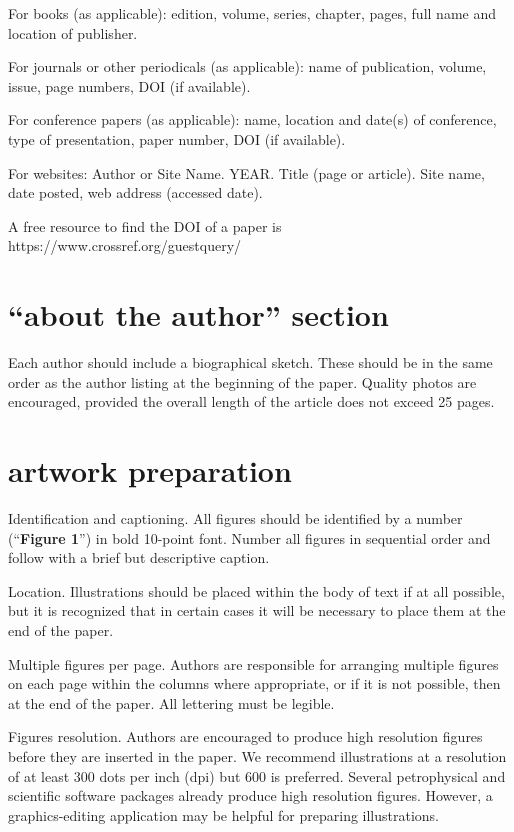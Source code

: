 \documentclass[10pt,twocolumn,twoside]{article}
\begin{document}
For books (as applicable): edition, volume, series, chapter, pages, full name and location of publisher.

For journals or other periodicals (as applicable): name of publication, volume, issue, page numbers, DOI (if available).

For conference papers (as applicable): name, location and date(s) of conference, type of presentation, paper number, DOI (if available). 

For websites: Author or Site Name. YEAR. Title (page or article). Site name, date posted, web address (accessed date). 

A free resource to find the DOI of a paper is https://www.crossref.org/guestquery/ 

\section{“about the author” section}
Each author should include a biographical sketch. These should be in the same order as the author listing at the beginning of the paper. Quality photos are encouraged, provided the overall length of the article does not exceed 25 pages.

\section{artwork preparation}
Identification and captioning. All figures should be identified by a number (“\textbf{Figure 1}”) in bold 10-point font. Number all figures in sequential order and follow with a brief but descriptive caption. 

Location. Illustrations should be placed within the body of text if at all possible, but it is recognized that in certain cases it will be necessary to place them at the end of the paper.

Multiple figures per page. Authors are responsible for arranging multiple figures on each page within the columns where appropriate, or if it is not possible, then at the end of the paper. All lettering must be legible.

Figures resolution. Authors are encouraged to produce high resolution figures before they are inserted in the paper. We recommend illustrations at a resolution of at least 300 dots per inch (dpi) but 600 is preferred. Several petrophysical and scientific software packages already produce high resolution figures. However, a graphics-editing application may be helpful for preparing illustrations. 
\end{document}
